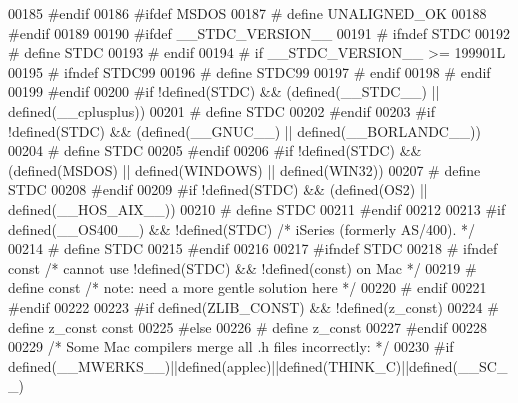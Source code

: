 \begin{DoxyCode}
00185 \textcolor{preprocessor}{#endif}
00186 \textcolor{preprocessor}{#ifdef MSDOS}
00187 \textcolor{preprocessor}{#  define UNALIGNED\_OK}
00188 \textcolor{preprocessor}{#endif}
00189 
00190 \textcolor{preprocessor}{#ifdef \_\_STDC\_VERSION\_\_}
00191 \textcolor{preprocessor}{#  ifndef STDC}
00192 \textcolor{preprocessor}{#    define STDC}
00193 \textcolor{preprocessor}{#  endif}
00194 \textcolor{preprocessor}{#  if \_\_STDC\_VERSION\_\_ >= 199901L}
00195 \textcolor{preprocessor}{#    ifndef STDC99}
00196 \textcolor{preprocessor}{#      define STDC99}
00197 \textcolor{preprocessor}{#    endif}
00198 \textcolor{preprocessor}{#  endif}
00199 \textcolor{preprocessor}{#endif}
00200 \textcolor{preprocessor}{#if !defined(STDC) && (defined(\_\_STDC\_\_) || defined(\_\_cplusplus))}
00201 \textcolor{preprocessor}{#  define STDC}
00202 \textcolor{preprocessor}{#endif}
00203 \textcolor{preprocessor}{#if !defined(STDC) && (defined(\_\_GNUC\_\_) || defined(\_\_BORLANDC\_\_))}
00204 \textcolor{preprocessor}{#  define STDC}
00205 \textcolor{preprocessor}{#endif}
00206 \textcolor{preprocessor}{#if !defined(STDC) && (defined(MSDOS) || defined(WINDOWS) || defined(WIN32))}
00207 \textcolor{preprocessor}{#  define STDC}
00208 \textcolor{preprocessor}{#endif}
00209 \textcolor{preprocessor}{#if !defined(STDC) && (defined(OS2) || defined(\_\_HOS\_AIX\_\_))}
00210 \textcolor{preprocessor}{#  define STDC}
00211 \textcolor{preprocessor}{#endif}
00212 
00213 \textcolor{preprocessor}{#if defined(\_\_OS400\_\_) && !defined(STDC)    }\textcolor{comment}{/* iSeries (formerly AS/400). */}\textcolor{preprocessor}{}
00214 \textcolor{preprocessor}{#  define STDC}
00215 \textcolor{preprocessor}{#endif}
00216 
00217 \textcolor{preprocessor}{#ifndef STDC}
00218 \textcolor{preprocessor}{#  ifndef const }\textcolor{comment}{/* cannot use !defined(STDC) && !defined(const) on Mac */}\textcolor{preprocessor}{}
00219 \textcolor{preprocessor}{#    define const       }\textcolor{comment}{/* note: need a more gentle solution here */}\textcolor{preprocessor}{}
00220 \textcolor{preprocessor}{#  endif}
00221 \textcolor{preprocessor}{#endif}
00222 
00223 \textcolor{preprocessor}{#if defined(ZLIB\_CONST) && !defined(z\_const)}
00224 \textcolor{preprocessor}{#  define z\_const const}
00225 \textcolor{preprocessor}{#else}
00226 \textcolor{preprocessor}{#  define z\_const}
00227 \textcolor{preprocessor}{#endif}
00228 
00229 \textcolor{comment}{/* Some Mac compilers merge all .h files incorrectly: */}
00230 \textcolor{preprocessor}{#if defined(\_\_MWERKS\_\_)||defined(applec)||defined(THINK\_C)||defined(\_\_SC\_\_)}

\end{DoxyCode}
